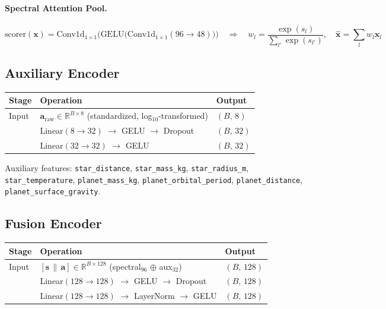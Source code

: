\documentclass[11pt,a4paper]{article}
\begin{document}
\paragraph{Spectral Attention Pool.}
\begin{equation}
\text{scorer}(\mathbf{x}) = \text{Conv1d}_{1\times1}\!\bigl(\text{GELU}\bigl(\text{Conv1d}_{1\times1}(96\to 48)\bigr)\bigr)
\quad\Rightarrow\quad
w_l = \frac{\exp(s_l)}{\sum_{l'}\exp(s_{l'})},\quad
\hat{\mathbf{x}} = \sum_l w_l \mathbf{x}_l
\end{equation}

\subsection{Auxiliary Encoder}

\begin{center}
\begin{tabular}{l l l}
\toprule
\textbf{Stage} & \textbf{Operation} & \textbf{Output} \\
\midrule
Input & $\mathbf{a}_{\mathrm{raw}} \in \mathbb{R}^{B\times 8}$ (standardized, log$_{10}$-transformed) & $(B,\,8)$ \\
& Linear$(8\to 32)$ $\to$ GELU $\to$ Dropout & $(B,\,32)$ \\
& Linear$(32\to 32)$ $\to$ GELU & $(B,\,32)$ \\
\bottomrule
\end{tabular}
\end{center}

\noindent Auxiliary features: \texttt{star\_distance}, \texttt{star\_mass\_kg}, \texttt{star\_radius\_m},
\texttt{star\_temperature}, \texttt{planet\_mass\_kg}, \texttt{planet\_orbital\_period},
\texttt{planet\_distance}, \texttt{planet\_surface\_gravity}.

\subsection{Fusion Encoder}

\begin{center}
\begin{tabular}{l l l}
\toprule
\textbf{Stage} & \textbf{Operation} & \textbf{Output} \\
\midrule
Input & $[\mathbf{s}\,\|\,\mathbf{a}]\in\mathbb{R}^{B\times 128}$ \;(spectral$_{96}$ $\oplus$ aux$_{32}$) & $(B,\,128)$ \\
& Linear$(128\to 128)$ $\to$ GELU $\to$ Dropout & $(B,\,128)$ \\
& Linear$(128\to 128)$ $\to$ LayerNorm $\to$ GELU & $(B,\,128)$ \\
\bottomrule
\end{tabular}
\end{center}
\end{document}
